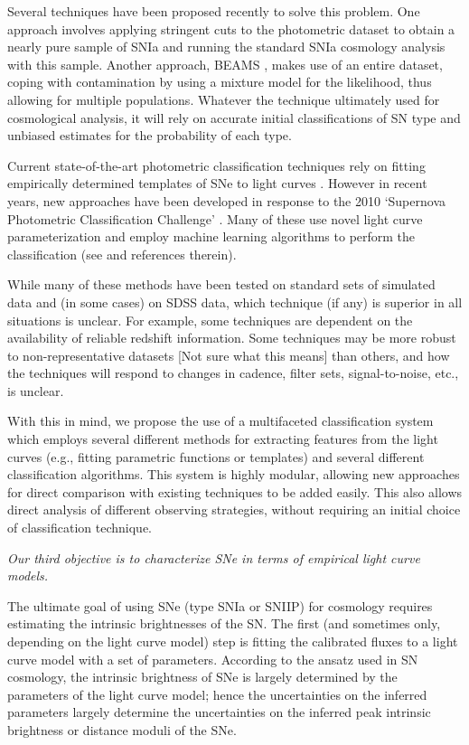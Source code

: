 Several techniques have been proposed recently to solve this problem. One 
approach involves applying stringent cuts to the photometric dataset to obtain a nearly pure sample 
of SNIa\citep{Bernstein2012,Campbell2013} and running the standard SNIa cosmology analysis 
with this sample. Another approach, BEAMS \citep{Kunz2007,Newling2011,Hlozek2012,Knights2013}, 
makes use of an entire dataset, coping with contamination by using a mixture model for the 
likelihood, thus allowing for multiple populations. Whatever the technique ultimately used for 
cosmological analysis, it will rely on accurate initial classifications of SN type and 
unbiased estimates for the probability of each type.

Current state-of-the-art photometric classification techniques rely on
fitting empirically determined templates of SNe to light curves
\citep{Jha2007,Guy2007,Sako2011}. However in recent years, new approaches
have been developed in response to the 2010 `Supernova Photometric
Classification Challenge' \citep{Kessler2010a}. Many of these use novel
light curve parameterization and employ machine learning algorithms to
perform the classification (see \citet{Kessler2010b} and references
therein).

While many of these methods have been tested on standard sets of simulated data and (in some cases) 
on SDSS data, which technique (if any) is superior in all situations is unclear. For 
example, some techniques are dependent on the availability of reliable redshift information. 
Some techniques may be more robust to non-representative datasets [Not sure what this means] than 
others, and how the techniques will respond to changes in cadence, filter sets, signal-to-noise, 
etc., is unclear.  

With this in mind, we propose the use of a multifaceted classification system which
employs several different methods for extracting features from the light curves (e.g.,
fitting parametric functions or templates) and several different classification
algorithms. This system is highly modular, allowing new approaches for direct comparison
with existing  techniques to be added easily. This also allows direct analysis of
different observing strategies, without requiring an initial choice of classification
technique.


{\emph{Our third objective is to characterize SNe in terms of empirical
    light curve models.}}

The ultimate goal of using SNe (type SNIa or SNIIP) for cosmology requires estimating the
intrinsic brightnesses of the SN. The first (and sometimes only, depending on the light
curve model) step is fitting the calibrated fluxes to a light curve model with a set of
parameters. According to the ansatz used in SN cosmology, the intrinsic brightness of SNe
is largely determined by the parameters of the light curve model; hence the uncertainties
on the inferred parameters largely determine the uncertainties on the inferred peak
intrinsic brightness or distance moduli of the SNe.

